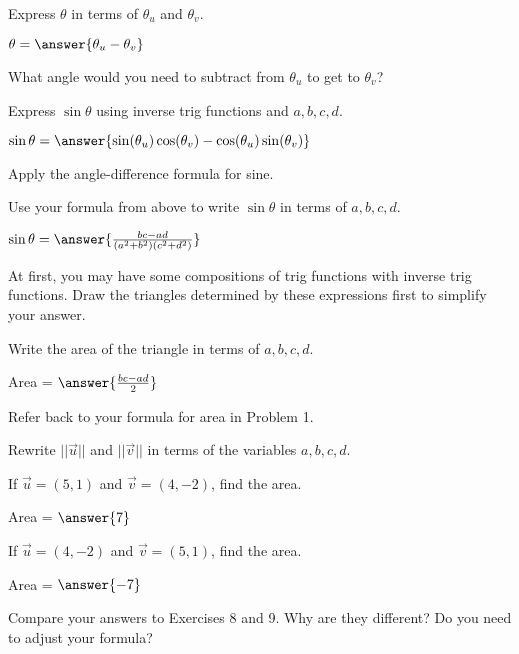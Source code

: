 \documentclass[number]{ximera}
\begin{document}
\begin{problem}
Express $\theta$ in terms of $\theta_u$ and $\theta_v$.

$\theta = \answer{\theta_u-\theta_v}$ %
\begin{hint}
What angle would you need to subtract from $\theta_u$ to get to $\theta_v$?
\end{hint}
\end{problem}

\begin{problem}
Express $\sin \theta$ using inverse trig functions and $a,b,c,d$.

$\sin\theta=\answer{\sin(\theta_u)\cos(\theta_v)-\cos(\theta_u)\sin(\theta_v)}$
\begin{hint}
Apply the angle-difference formula for sine.
\end{hint}
\end{problem}

\begin{problem}
Use your formula from above to write $\sin \theta$ in terms of $a,b,c,d$.

$\sin\theta = \answer{\frac{bc-ad}{(a^2+b^2)(c^2+d^2)}}$
\begin{hint}
At first, you may have some compositions of trig functions with inverse trig functions. Draw the triangles determined by these expressions first to simplify your answer.
\end{hint}
\end{problem}

\begin{problem}
Write the area of the triangle in terms of $a,b,c,d$.

Area = $\answer{\frac{bc-ad}{2}}$
\begin{hint}
Refer back to your formula for area in Problem 1.
\end{hint}
\begin{hint}
Rewrite $||\vec{u}||$ and $||\vec{v}||$ in terms of the variables $a,b,c,d$.
\end{hint}
\end{problem}

\begin{exercise}
If $\overrightarrow u = (5,1)$ and $\overrightarrow v = (4,-2)$, find the area. 

Area = $\answer{7}$
\end{exercise}

\begin{exercise}
If $\overrightarrow u = (4,-2)$ and $\overrightarrow v = (5,1)$, find the area.  

Area = $\answer{-7}$
\end{exercise}

\begin{question}
Compare your answers to Exercises 8 and 9. Why are they different? Do you need to adjust your formula?
\begin{freeResponse}

\end{freeResponse}
\end{question}
\end{document}
